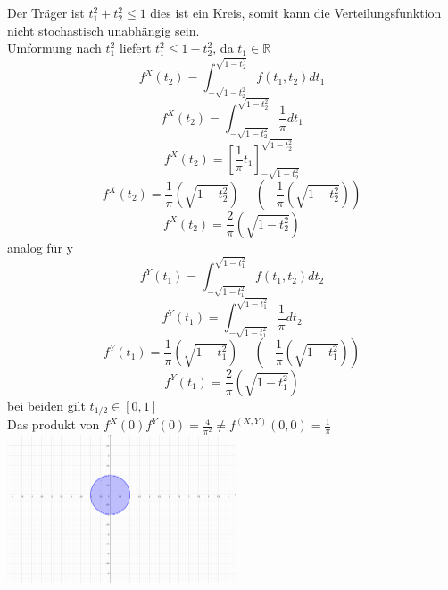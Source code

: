 \documentclass{article}
\begin{document}
	\section{}
	Der Träger ist $t_1^2+t_2^2\leq 1$ dies ist ein Kreis, somit kann die Verteilungsfunktion nicht stochastisch unabhängig sein.\\
	Umformung nach $t_1^2$ liefert $t_1^2\leq 1-t_2^2$, da $t_1\in\mathbb{R}$
	\[f^{X}(t_2)=\int_{-\sqrt{1-t_2^2}}^{\sqrt{1-t_2^2}} f(t_1,t_2)dt_1 \]
	\[f^{X}(t_2)=\int_{-\sqrt{1-t_2^2}}^{\sqrt{1-t_2^2}} \frac{1}{\pi}dt_1 \]
	\[f^{X}(t_2)= [\frac{1}{\pi}t_1]_{-\sqrt{1-t_2^2}}^{\sqrt{1-t_2^2}} \]
	\[f^{X}(t_2)= \frac{1}{\pi}(\sqrt{1-t_2^2}) - (-\frac{1}{\pi}(\sqrt{1-t_2^2})) \]
	\[f^{X}(t_2)= \frac{2}{\pi}(\sqrt{1-t_2^2}) \]
	analog für y\\
	\[f^{Y}(t_1)=\int_{-\sqrt{1-t_1^2}}^{\sqrt{1-t_1^2}} f(t_1,t_2)dt_2 \]
	\[f^{Y}(t_1)=\int_{-\sqrt{1-t_1^2}}^{\sqrt{1-t_1^2}} \frac{1}{\pi}dt_2 \]
	\[f^{Y}(t_1)=\frac{1}{\pi}(\sqrt{1-t_1^2})- (-\frac{1}{\pi}(\sqrt{1-t_1^2}))\]
	\[f^{Y}(t_1)=\frac{2}{\pi}(\sqrt{1-t_1^2})\]
	bei beiden gilt $t_{1/2}\in [0,1]$\\
	Das produkt von $f^{X}(0)f^{Y}(0) =\frac{4}{\pi^2}\neq f^{(X,Y)}(0,0) =\frac{1}{\pi}$\\
	\includegraphics[width=256px]{geogebra-export.png}
\end{document}

